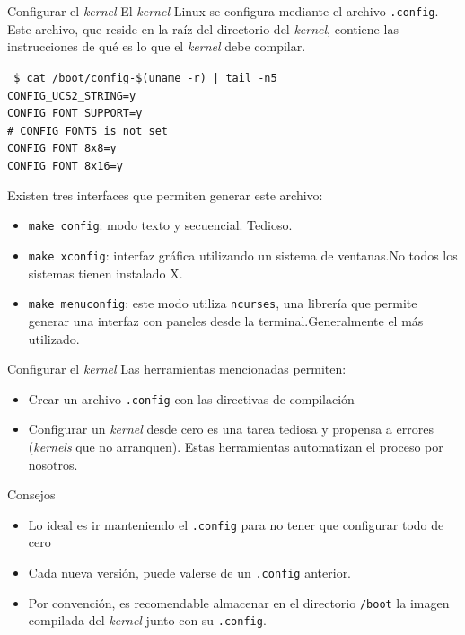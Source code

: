 \begin{frame}{Configurar el \textit{kernel}}
  El \textit{kernel} Linux se configura mediante el archivo
  \texttt{.config}. Este archivo, que reside en la raíz del directorio del
  \textit{kernel}, contiene las instrucciones de qué es lo que el
  \textit{kernel} debe compilar.

  \begin{block}{}
    \tiny {
    \texttt{%
\$ cat /boot/config-\$(uname -r) | tail -n5 \\
CONFIG\_UCS2\_STRING=y \\
CONFIG\_FONT\_SUPPORT=y \\
\# CONFIG\_FONTS is not set \\
CONFIG\_FONT\_8x8=y \\
CONFIG\_FONT\_8x16=y}}
  \end{block}
\pause
Existen tres interfaces que permiten generar este archivo:
\begin{itemize}
\item \texttt{make config}: modo texto y secuencial. \alert{Tedioso}.
\item \texttt{make xconfig}: interfaz gráfica utilizando un sistema de
  ventanas.\alert{No todos los sistemas tienen instalado X}.
\item \texttt{make menuconfig}: este modo utiliza \texttt{ncurses}, una
  librería que permite generar una interfaz con paneles desde la terminal.\alert{Generalmente el más utilizado}.
\end{itemize}
\end{frame}

\begin{frame}{Configurar el \textit{kernel}}
Las herramientas mencionadas permiten:
\begin{itemize}
\item Crear un archivo \texttt{.config} con las directivas de compilación
\item Configurar un \textit{kernel} desde cero es una tarea tediosa y
  propensa a errores (\textit{kernels} que no arranquen). Estas
  herramientas automatizan el proceso por nosotros.
\end{itemize}

\begin{block}{Consejos}
\begin{itemize}
\item Lo ideal es ir manteniendo el \texttt{.config} para no tener que
  configurar todo de cero

\item Cada nueva versión, puede valerse de un \texttt{.config} anterior.

\item Por convención, es recomendable almacenar en el directorio
  \texttt{/boot} la imagen compilada del \textit{kernel} junto con su
  \texttt{.config}.
\end{itemize}
\end{block}
\end{frame}

